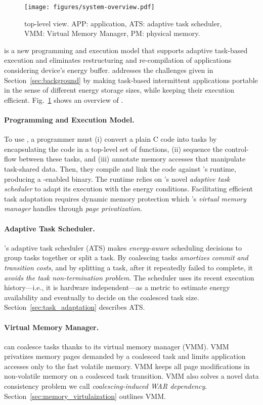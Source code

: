 \begin{figure}
	\centering
	\texttt{[image: figures/system-overview.pdf]}
	\caption{\sys top-level view. APP: application, ATS: adaptive task scheduler, VMM: Virtual Memory Manager, PM: physical memory.}
	\label{fig:system_overview}
\end{figure}

\sys is a new programming and execution model that supports adaptive task-based execution and eliminates restructuring and re-compilation of applications considering device's energy buffer. \sys addresses the challenges given in Section~\ref{sec:background} by making task-based intermittent applications portable in the sense of different energy storage sizes, while keeping their execution efficient. Fig.~\ref{fig:system_overview} shows an overview of \sys.

\paragraph{Programming and Execution Model.}
To use \sys, a programmer must (i) convert a plain C code into tasks by encapsulating the code in a top-level set of functions, (ii) sequence the control-flow between these tasks, and (iii) annotate memory accesses that manipulate task-shared data. Then, they compile and link the code against \sys's runtime, producing a \sys-enabled binary. The runtime relies on \sys's novel {\em adaptive task scheduler} to adapt its execution with the energy conditions. Facilitating efficient task adaptation requires dynamic memory protection which \sys's \emph{virtual memory manager} handles through \emph{page privatization}.

\paragraph{Adaptive Task Scheduler.}
\sys's adaptive task scheduler (ATS) makes \emph{energy-aware} scheduling decisions to group tasks together or split a task. By coalescing tasks \sys \emph{amortizes commit and transition costs}, and by splitting a task, after it repeatedly failed to complete, it \emph{avoids the task non-termination problem}. The scheduler uses its recent execution history---i.e., it is hardware independent---as a metric to estimate energy availability and eventually to decide on the coalesced task size. Section~\ref{sec:task_adaptation} describes ATS.

\paragraph{Virtual Memory Manager.}
\sys can coalesce tasks thanks to its virtual memory manager (VMM). VMM privatizes memory pages demanded by a coalesced task and limits application accesses only to the fast volatile memory. VMM keeps all page modifications in non-volatile memory on a coalesced task transition. VMM also solves a novel data consistency problem we call \emph{coalescing-induced WAR dependency}. Section~\ref{sec:memory_virtulaization} outlines VMM.

